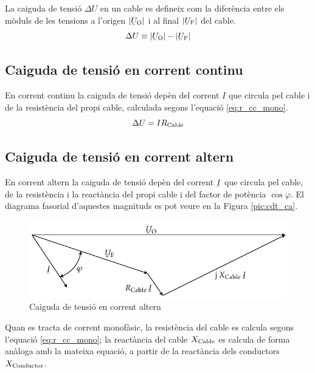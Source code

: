 La caiguda de tensi\'{o} $\Delta U$ en un cable es defineix com la difer\`{e}ncia entre els m\`{o}duls de les tensions a l'origen $|{\cmplx{U}\ped{O}}|$ i al final $|\cmplx{U}\ped{F}|$ del cable.
\begin{equation}
   \Delta U \equiv |\cmplx{U}\ped{O}| - |\cmplx{U}\ped{F}|
\end{equation}

\subsection{Caiguda de tensi\'{o} en corrent continu}

En corrent continu la caiguda de tensi\'{o} dep\`{e}n del corrent $I$ que circula pel cable i de la  resist\`{e}ncia del propi cable, calculada segons l'equaci\'{o} \eqref{eq:r_cc_mono}.
\begin{equation}
   \Delta U = I R_\mathrm{Cable}
\end{equation}

\subsection{Caiguda de tensi\'{o} en corrent altern}

En corrent altern la caiguda de tensi\'{o}
dep\`{e}n del  corrent $\cmplx{I}$ que circula pel cable, de la
resist\`{e}ncia i la react\`{a}ncia del propi cable i del factor de
pot\`{e}ncia $\cos \varphi$. El diagrama fasorial d'aquestes magnituds
es pot veure en la Figura \vref{pic:cdt_ca}.
\begin{figure}[htb]
   \centering
   \includegraphics{Imatges/Cap-Cables-Caiguda-Tensio.pdf}
   \caption{Caiguda de tensi\'{o} en corrent altern}\label{pic:cdt_ca}
\end{figure}

Quan es tracta de corrent monof\`{a}sic, la resist\`{e}ncia del cable es calcula segons l'equaci\'{o}
\eqref{eq:r_cc_mono}; la react\`{a}ncia del cable $X_\mathrm{Cable}$ es calcula de forma an\`{a}loga
amb la mateixa equaci\'{o}, a partir de la react\`{a}ncia dels conductors $X_\mathrm{Conductor}$.

